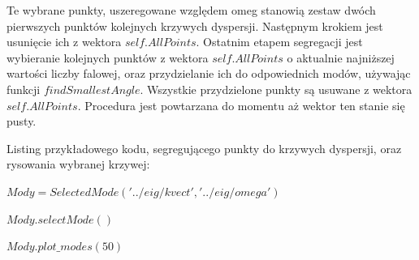 Te wybrane punkty, uszeregowane względem omeg stanowią zestaw dwóch pierwszych punktów kolejnych krzywych dyspersji. Następnym krokiem jest usunięcie ich z wektora $self.AllPoints$. Ostatnim etapem segregacji jest wybieranie kolejnych punktów z wektora $self.AllPoints$ o aktualnie najniższej wartości liczby falowej, oraz przydzielanie ich do odpowiednich modów, używając funkcji $findSmallestAngle$. Wszystkie przydzielone punkty są usuwane z wektora $self.AllPoints$. Procedura jest powtarzana do momentu aż wektor ten stanie się pusty.

Listing przykładowego kodu, segregującego punkty do krzywych dyspersji, oraz rysowania wybranej krzywej:

$Mody = SelectedMode('../eig/kvect', '../eig/omega')$

$Mody.selectMode()$

$Mody.plot\_modes(50)$

